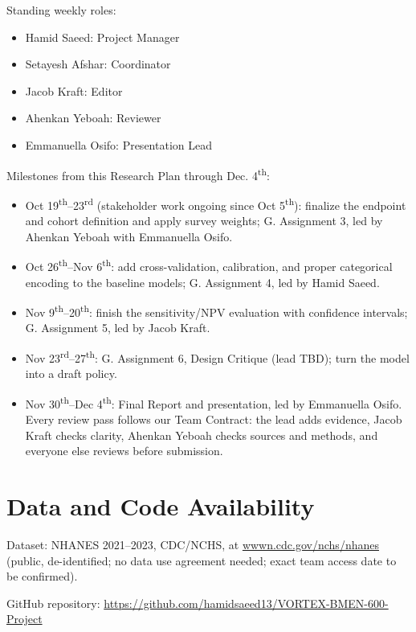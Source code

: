 \documentclass[conference]{IEEEtran}
\begin{document}
Standing weekly roles:
\begin{itemize}
    \item Hamid Saeed: Project Manager
    \item Setayesh Afshar: Coordinator
    \item Jacob Kraft: Editor
    \item Ahenkan Yeboah: Reviewer
    \item Emmanuella Osifo: Presentation Lead
\end{itemize} 
\medskip

Milestones from this Research Plan through Dec. 4\textsuperscript{th}:
\begin{itemize}
    \item Oct 19\textsuperscript{th}–23\textsuperscript{rd} (stakeholder work ongoing since Oct 5\textsuperscript{th}): finalize the endpoint and cohort definition and apply survey weights; G. Assignment 3, led by Ahenkan Yeboah with Emmanuella Osifo.
    \item Oct 26\textsuperscript{th}–Nov 6\textsuperscript{th}: add cross-validation, calibration, and proper categorical encoding to the baseline models; G. Assignment 4, led by Hamid Saeed.
\item Nov 9\textsuperscript{th}–20\textsuperscript{th}: finish the sensitivity/NPV evaluation with confidence intervals; G. Assignment 5, led by Jacob Kraft.
\item Nov 23\textsuperscript{rd}–27\textsuperscript{th}: G. Assignment 6, Design Critique (lead TBD); turn the model into a draft policy.
\item Nov 30\textsuperscript{th}–Dec 4\textsuperscript{th}: Final Report and presentation, led by Emmanuella Osifo.
Every review pass follows our Team Contract: the lead adds evidence, Jacob Kraft checks clarity, Ahenkan Yeboah checks sources and methods, and everyone else reviews before submission.

\end{itemize}


\section*{Data and Code Availability}

Dataset: NHANES 2021--2023, CDC/NCHS, at \url{wwwn.cdc.gov/nchs/nhanes} (public, de-identified; no data use agreement needed; exact team access date to be confirmed).


GitHub repository: \url{https://github.com/hamidsaeed13/VORTEX-BMEN-600-Project}
\end{document}
